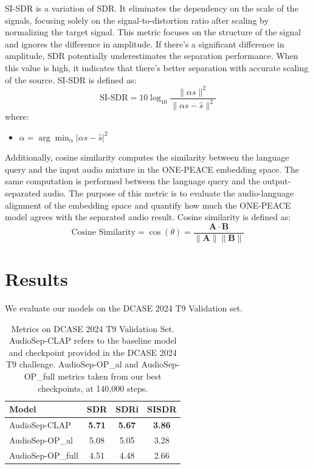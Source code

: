 \documentclass[11pt]{article}
\begin{document}
SI-SDR is a variation of SDR. It eliminates the dependency on the scale of the signals, focusing solely on the signal-to-distortion ratio after scaling by normalizing the target signal. This metric focuses on the structure of the signal and ignores the difference in amplitude. If there's a significant difference in amplitude, SDR potentially underestimates the separation performance.  When this value is high, it indicates that there’s better separation with accurate scaling of the source. SI-SDR is defined as:
\[
\text{SI-SDR} = 10 \log_{10} \frac{\| \alpha s \|^2}{\| \alpha s - \hat{s} \|^2}
\]
where:
\begin{itemize}
    \item \( \alpha = \arg\min_{\alpha} \left| \alpha s - \hat{s} \right|^2\)
\end{itemize}

Additionally, cosine similarity computes the similarity between the language query and the input audio mixture in the ONE-PEACE embedding space. The same computation is performed between the language query and the output-separated audio. The purpose of this metric is to evaluate the audio-language alignment of the embedding space and quantify how much the ONE-PEACE model agrees with the separated audio result. Cosine similarity is defined as:
\[
\text{Cosine Similarity} = \cos(\theta) = \frac{\mathbf{A} \cdot \mathbf{B}}{\|\mathbf{A}\| \|\mathbf{B}\|}
\]

\section{Results}
We evaluate our models on the DCASE 2024 T9 Validation set.

\begin{table}[!htbp]
  \centering

  \begin{tabular}{lccc}
    \hline
    \textbf{Model}       & \textbf{SDR}  & \textbf{SDRi} & \textbf{SISDR} \\
    \hline
     AudioSep-CLAP       & \textbf{5.71} & \textbf{5.67} & \textbf{3.86}   \\
     AudioSep-OP\_al     & 5.08          & 5.05          & 3.28   \\
     AudioSep-OP\_full   & 4.51          & 4.48          & 2.66   \\
    \hline
  \end{tabular}
  \caption{Metrics on DCASE 2024 T9 Validation Set. AudioSep-CLAP refers to the baseline model and checkpoint provided in the DCASE 2024 T9 challenge. AudioSep-OP\_al and AudioSep-OP\_full metrics taken from our best checkpoints, at 140,000 steps.}
  \label{tab:accents}
\end{table}
\end{document}
